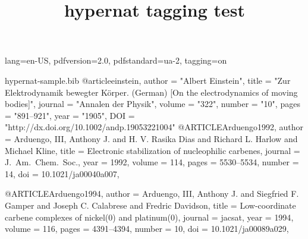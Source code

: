 \ifdefined\Uchar\RequirePackage{luatagging}\fi
\DocumentMetadata
  {
    lang=en-US,
    pdfversion=2.0,
    pdfstandard=ua-2,
    tagging=on
  }
\begin{filecontents}{hypernat-sample.bib}
@article{einstein,
    author =       "Albert Einstein",
    title =        "{Zur Elektrodynamik bewegter K{\"o}rper}. ({German})
        [{On} the electrodynamics of moving bodies]",
    journal =      "Annalen der Physik",
    volume =       "322",
    number =       "10",
    pages =        "891--921",
    year =         "1905",
    DOI =          "http://dx.doi.org/10.1002/andp.19053221004"
}
@ARTICLE{Arduengo1992,
  author = {Arduengo, III, Anthony J. and H. V. Rasika Dias and
    Richard L. Harlow and Michael Kline},
  title = {Electronic stabilization of nucleophilic carbenes},
  journal = {J.~Am.\ Chem.\ Soc.},
  year = {1992},
  volume = {114},
  pages = {5530--5534},
  number = {14},
  doi = {10.1021/ja00040a007},
}

@ARTICLE{Arduengo1994,
  author = {Arduengo, III, Anthony J. and Siegfried F. Gamper and
    Joseph C. Calabrese and Fredric Davidson},
  title = {{Low}-coordinate carbene complexes of nickel(0) and
    platinum(0)},
  journal = {jacsat},
  year = {1994},
  volume = {116},
  pages = {4391--4394},
  number = {10},
  doi = {10.1021/ja00089a029},
}
\end{filecontents}

\documentclass{article}

\usepackage[numbers,sort&compress]{natbib}
\usepackage{hyperref}
\usepackage{hypernat}

\title{hypernat tagging test}



Some text \cite{einstein,Arduengo1992} some more text.

Some text ending a sentence \cite{einstein,Arduengo1992,Arduengo1994}.




